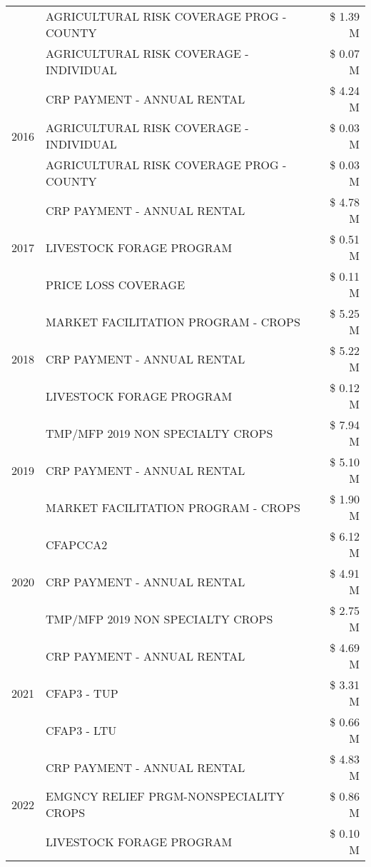 \begin{tabular}{llr}
 & AGRICULTURAL RISK COVERAGE PROG - COUNTY & \$ 1.39 M \\
 & AGRICULTURAL RISK COVERAGE - INDIVIDUAL & \$ 0.07 M \\
\cline{1-3}
\multirow[t]{3}{*}{2016} & CRP PAYMENT - ANNUAL RENTAL & \$ 4.24 M \\
 & AGRICULTURAL RISK COVERAGE - INDIVIDUAL & \$ 0.03 M \\
 & AGRICULTURAL RISK COVERAGE PROG - COUNTY & \$ 0.03 M \\
\cline{1-3}
\multirow[t]{3}{*}{2017} & CRP PAYMENT - ANNUAL RENTAL & \$ 4.78 M \\
 & LIVESTOCK FORAGE PROGRAM & \$ 0.51 M \\
 & PRICE LOSS COVERAGE & \$ 0.11 M \\
\cline{1-3}
\multirow[t]{3}{*}{2018} & MARKET FACILITATION PROGRAM - CROPS & \$ 5.25 M \\
 & CRP PAYMENT - ANNUAL RENTAL & \$ 5.22 M \\
 & LIVESTOCK FORAGE PROGRAM & \$ 0.12 M \\
\cline{1-3}
\multirow[t]{3}{*}{2019} & TMP/MFP 2019 NON SPECIALTY CROPS & \$ 7.94 M \\
 & CRP PAYMENT - ANNUAL RENTAL & \$ 5.10 M \\
 & MARKET FACILITATION PROGRAM - CROPS & \$ 1.90 M \\
\cline{1-3}
\multirow[t]{3}{*}{2020} & CFAPCCA2 & \$ 6.12 M \\
 & CRP PAYMENT - ANNUAL RENTAL & \$ 4.91 M \\
 & TMP/MFP 2019 NON SPECIALTY CROPS & \$ 2.75 M \\
\cline{1-3}
\multirow[t]{3}{*}{2021} & CRP PAYMENT - ANNUAL RENTAL & \$ 4.69 M \\
 & CFAP3 - TUP & \$ 3.31 M \\
 & CFAP3 - LTU & \$ 0.66 M \\
\cline{1-3}
\multirow[t]{3}{*}{2022} & CRP PAYMENT - ANNUAL RENTAL & \$ 4.83 M \\
 & EMGNCY RELIEF PRGM-NONSPECIALITY CROPS & \$ 0.86 M \\
 & LIVESTOCK FORAGE PROGRAM & \$ 0.10 M \\
\cline{1-3}
\bottomrule
\end{tabular}
